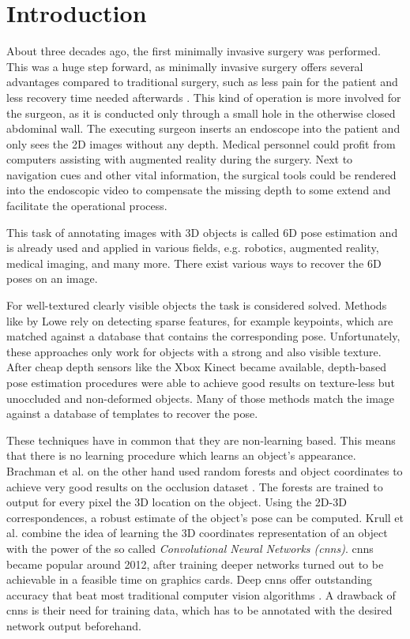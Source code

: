 \chapter{Introduction}

About three decades ago, the first minimally invasive surgery was performed. This was a huge step forward, as minimally invasive surgery offers several advantages compared to traditional surgery, such as less pain for the patient and less recovery time needed afterwards \cite{minimallyinvasive}. This kind of operation is more involved for the surgeon, as it is conducted only through a small hole in the otherwise closed abdominal wall. The executing surgeon inserts an endoscope into the patient and only sees the 2D images without any depth. Medical personnel could profit from computers assisting with augmented reality during the surgery. Next to navigation cues and other vital information, the surgical tools could be rendered into the  endoscopic video to compensate the missing depth to some extend and facilitate the operational process. \

This task of annotating images with 3D objects is called 6D pose estimation and is already used and applied in various fields, e.g. robotics, augmented reality, medical imaging, and many more. There exist various ways to recover the 6D poses on an image. 

For well-textured clearly visible objects the task is considered solved. Methods like \cite{dglowe1} by Lowe \etal rely on detecting sparse features, for example keypoints, which are matched against a database that contains the corresponding pose.
Unfortunately, these approaches only work for objects with a strong and also visible texture. After cheap depth sensors like the Xbox Kinect became available, depth-based pose estimation procedures were able to achieve good results on texture-less but unoccluded and non-deformed objects. Many of those methods match the image against a database of templates to recover the pose. 

These techniques have in common that they are non-learning based. This means that there is no learning procedure which learns an object's appearance. Brachman et al. on the other hand used random forests and object coordinates to achieve very good results on the occlusion dataset \cite{brachmann1}. The forests are trained to output for every pixel the 3D location on the object. Using the 2D-3D correspondences, a robust estimate of the object's pose can be computed. Krull et al. \cite{akrull} combine the idea of learning the 3D coordinates representation of an object with the power of the so called \textit{Convolutional Neural Networks (\gls{cnn}s)}. \gls{cnn}s became popular around 2012, after training deeper networks turned out to be achievable in a feasible time on graphics cards. Deep \gls{cnn}s offer outstanding accuracy that beat most traditional computer vision algorithms \cite{ylecun}. A drawback of \gls{cnn}s is their need for training data, which has to be annotated with the desired network output beforehand.

